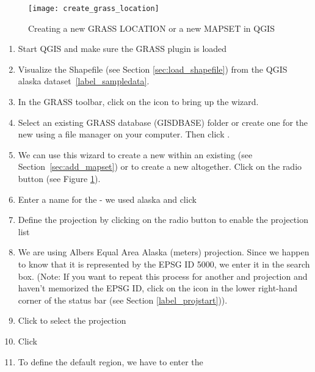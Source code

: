 \begin{figure}[ht]
\begin{center}
\caption{Creating a new GRASS LOCATION or a new MAPSET in QGIS \nixcaption}
\label{fig:create_grass_location}\smallskip
\texttt{[image: create\_grass\_location]}
\end{center}  
\end{figure}

\begin{enumerate}
  \item Start QGIS and make sure the GRASS plugin is loaded
  \item Visualize the  Shapefile (see Section
  \ref{sec:load_shapefile}) from the QGIS alaska dataset~\ref{label_sampledata}.
  \item In the GRASS toolbar, click on the  icon to bring up the  wizard.
  \item Select an existing GRASS database (GISDBASE) folder 
   or create one for the new  using a 
  file manager on your computer. Then click . 
  \item We can use this wizard to create a new  within an 
  existing  (see Section~\ref{sec:add_mapset}) or to create 
  a new  altogether. Click on the radio button
   (see Figure \ref{fig:create_grass_location}).
  \item Enter a name for the  - we used alaska and click 
  \item Define the projection by clicking on the radio button
   to enable the projection list 
  \item We are using Albers Equal Area Alaska (meters) projection. Since we
  happen to know that it is represented by the EPSG ID 5000, we enter it in
  the search box. (Note: If you want to repeat this process for another 
   and projection and haven't memorized the EPSG ID, 
  click on the
   icon in the lower right-hand
  corner of the status bar (see Section \ref{label_projstart})).
  \item Click  to select the projection
  \item Click  
  \item To define the default region, we have to enter the  

\end{enumerate}
